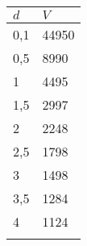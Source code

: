 \begin{tabular}{| l | l |}
\hline
$d$ & $V$\\ \hline
0,1 & 44950\\ \hline
0,5 & 8990\\ \hline
1 & 4495\\ \hline
1,5 & 2997\\ \hline
2 & 2248\\ \hline
2,5 & 1798\\ \hline
3 & 1498\\ \hline
3,5 & 1284\\ \hline
4 & 1124\\ \hline
\\ \hline
\end{tabular}